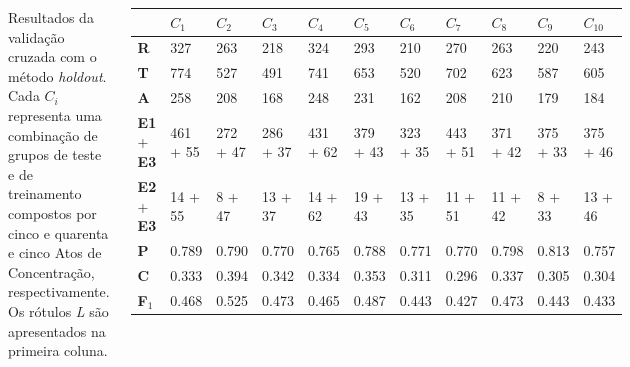 \documentclass[25pt, a2papper, portrait]{tikzposter}
\begin{document}
\begin{columns}
{    \vspace*{-0.2cm}
    }

    {
    Resultados da validação cruzada com o método \textit{holdout}. Cada $C_i$ representa uma combinação de grupos de teste e de treinamento compostos
    por cinco e quarenta e cinco Atos de Concentração, respectivamente. Os rótulos \textit{L} são apresentados na primeira coluna.

      \begin{center}
      \begin{tabular}{| P{4cm} | P{3cm} | P{3cm} | P{3cm} | P{3cm} | P{3cm} | P{3cm} | P{3cm} | P{3cm} | P{3cm} | P{3cm} |}
        \hline
         & $C_1$ & $C_2$ & $C_3$ & $C_4$ & $C_5$ & $C_6$ & $C_7$ & $C_8$ & $C_9$ & $C_{10}$ \\
        \hline
        \small{\textbf{R}}                 & \small{327} & \small{263} & \small{218} & \small{324} & \small{293} & \small{210} & \small{270} & \small{263} & \small{220} & \small{243} \\ \hline
        \small{\textbf{T}}                 & \small{774} & \small{527} & \small{491} & \small{741} & \small{653} & \small{520} & \small{702} & \small{623} & \small{587} & \small{605} \\ \hline
        \small{\textbf{A}}   & \small{258} & \small{208} & \small{168} & \small{248} & \small{231} & \small{162} & \small{208} & \small{210} & \small{179} & \small{184} \\ \hline
        \small{\textbf{E1} + \textbf{E3}} & \small{461 + 55} & \small{272 + 47} & \small{286 + 37} & \small{431 + 62} & \small{379 + 43} & \small{323 + 35} & \small{443 + 51} & \small{371 + 42} & \small{375 + 33} & \small{375 + 46} \\ \hline
        \small{\textbf{E2} + \textbf{E3}} & \small{14 + 55} & \small{8 + 47} & \small{13 + 37} & \small{14 + 62} & \small{19 + 43} & \small{13 + 35} & \small{11 + 51} & \small{11 + 42} & \small{8 + 33} & \small{13 + 46} \\ \hline\hline
        \small{\textbf{P}} & \small{0.789} & \small{0.790} & \small{0.770} & \small{0.765} & \small{0.788} & \small{0.771} & \small{0.770} & \small{0.798} & \small{0.813} & \small{0.757} \\ \hline
        \small{\textbf{C}} & \small{0.333} & \small{0.394} & \small{0.342} & \small{0.334} & \small{0.353} & \small{0.311} & \small{0.296} & \small{0.337} & \small{0.305} & \small{0.304} \\ \hline
        \small{\textbf{F$_1$}} & \small{0.468} & \small{0.525} & \small{0.473} & \small{0.465} & \small{0.487} & \small{0.443} & \small{0.427} & \small{0.473} & \small{0.443} & \small{0.433} \\ \hline
      \end{tabular}
      \end{center}

}
\end{columns}
\end{document}
